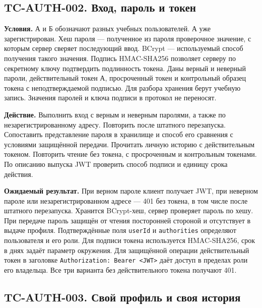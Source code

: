 \documentclass[12pt,a4paper]{article}
\begin{document}
\subsection{TC-AUTH-002. Вход, пароль и токен}\label{tc-auth-002-ux432ux445ux43eux434-ux43fux430ux440ux43eux43bux44c-ux438-ux442ux43eux43aux435ux43d}

\hypertarget{tc-auth-002-вход-пароль-и-токен}{}

\hypertarget{tc-auth-002}{}

\textbf{Условия.} А и Б обозначают разных учебных пользователей. А уже зарегистрирован. Хеш пароля --- полученное из пароля проверочное значение, с которым сервер сверяет последующий ввод. BCrypt --- используемый способ получения такого значения. Подпись HMAC-SHA256 позволяет серверу по секретному ключу подтвердить подлинность токена. Даны верный и неверный пароли, действительный токен А, просроченный токен и контрольный образец токена с неподтверждаемой подписью. Для разбора хранения берут учебную запись. Значения паролей и ключа подписи в протокол не переносят.

\textbf{Действие.} Выполнить вход с верным и неверным паролями, а также по незарегистрированному адресу. Повторить после штатного перезапуска. Сопоставить представление пароля в хранилище и способ его сравнения с условиями защищённой передачи. Прочитать личную историю с действительным токеном. Повторить чтение без токена, с просроченным и контрольным токенами. По описанию выпуска JWT проверить способ подписи и единицу срока действия.

\textbf{Ожидаемый результат.} При верном пароле клиент получает JWT, при неверном пароле или незарегистрированном адресе --- 401 без токена, в том числе после штатного перезапуска. Хранится BCrypt-хеш, сервер проверяет пароль по хешу. При передаче пароль защищён от чтения посторонней стороной и отсутствует в выдаче профиля. Подтверждённые поля \texttt{userId} и \texttt{authorities} определяют пользователя и его роли. Для подписи токена используется HMAC-SHA256, срок в днях задаёт параметр окружения. Для защищённой операции действительный токен в заголовке \texttt{Authorization:\ Bearer\ \textless{}JWT\textgreater{}} даёт доступ в пределах роли его владельца. Все три варианта без действительного токена получают 401.

\subsection{TC-AUTH-003. Свой профиль и своя история}\label{tc-auth-003-ux441ux432ux43eux439-ux43fux440ux43eux444ux438ux43bux44c-ux438-ux441ux432ux43eux44f-ux438ux441ux442ux43eux440ux438ux44f}
\end{document}
